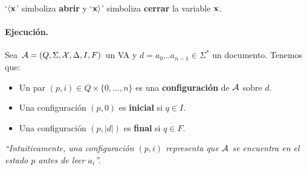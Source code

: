 `$\langle \mathbf{x}$' simboliza \textbf{abrir} y `$\mathbf{x}\rangle$' simboliza \textbf{cerrar} la variable $\mathbf{x}$.


\paragraph{Ejecución.} Sea $\mathcal{A} = (Q,\Sigma,\mathcal{X},\Delta,I,F)$ un VA y $d = a_0 \ldots a_{n-1} \in \Sigma^*$ un documento. Tenemos que:
\begin{itemize}
    \item Un par $(p, i) \in Q \times\{0, \ldots, n\}$ es una \textbf{configuración} de $\mathcal{A}$ sobre $d$.
    \item Una configuración $(p,0)$ es \textbf{inicial} si $q \in I$.
    \item Una configuración $(p, |d|)$ es \textbf{final} si $q \in F$.
\end{itemize}
\textit{``Intuitivamente, una configuración $(p,i)$ representa que $\mathcal{A}$ se encuentra en el estado $p$ antes de leer $a_i$''.} \bigbreak


